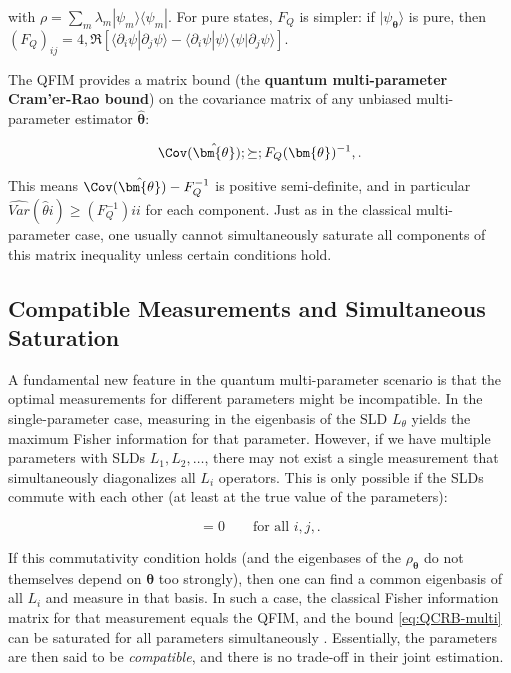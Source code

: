 with $\rho = \sum_m \lambda_m |\psi_m\rangle\langle \psi_m|$. For pure states, $F_Q$ is simpler: if $|\psi_{\bm{\theta}}\rangle$ is pure, then $(F_Q)_{ij} = 4,\Re[\langle \partial_i \psi | \partial_j \psi \rangle - \langle \partial_i \psi|\psi\rangle\langle\psi|\partial_j \psi\rangle]$.



The QFIM provides a matrix bound (the \textbf{quantum multi-parameter
  Cram'er-Rao bound}) on the covariance matrix of any unbiased
multi-parameter estimator $\hat{\bm{\theta}}$:

\begin{equation}

\Cov(\hat{\bm{\theta}}) ;\succeq; F_Q(\bm{\theta})^{-1} ,.

\label{eq:QCRB-multi}

\end{equation}

This means $ \Cov(\hat{\bm{\theta}}) - F_Q^{-1}$ is positive
semi-definite, and in particular $\widehat{Var}(\hat{\theta}i) \ge
(F_Q^{-1}){ii}$ for each component. Just as in the classical
multi-parameter case, one usually cannot simultaneously saturate all
components of this matrix inequality unless certain conditions hold.



\subsection{Compatible Measurements and Simultaneous Saturation}



A fundamental new feature in the quantum multi-parameter scenario is
that the optimal measurements for different parameters might be
incompatible. In the single-parameter case, measuring in the
eigenbasis of the SLD $L_\theta$ yields the maximum Fisher information
for that parameter. However, if we have multiple parameters with SLDs
$L_1, L_2, \ldots$, there may not exist a single measurement that
simultaneously diagonalizes all $L_i$ operators. This is only possible
if the SLDs commute with each other (at least at the true value of the
parameters):

\begin{equation}
[L_i, L_j] = 0 \qquad \text{for all } i,j ,.
\label{eq:SLD-comm}
\end{equation}

If this commutativity condition holds (and the eigenbases of the
$\rho_{\bm{\theta}}$ do not themselves depend on $\bm{\theta}$ too
strongly), then one can find a common eigenbasis of all $L_i$ and
measure in that basis. In such a case, the classical Fisher
information matrix for that measurement equals the QFIM, and the bound
\eqref{eq:QCRB-multi} can be saturated for all parameters
simultaneously \cite{Ragy2016}. Essentially, the parameters are then
said to be \textit{compatible}, and there is no trade-off in their
joint estimation.



